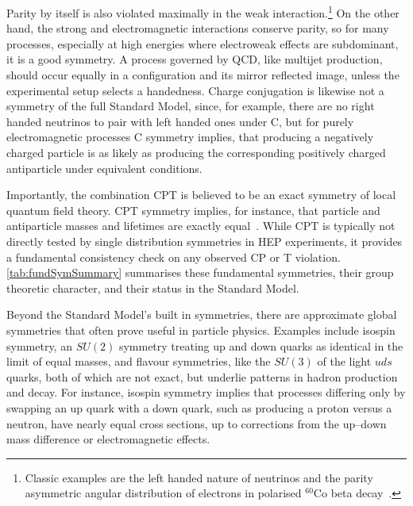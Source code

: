         Parity by itself is also violated maximally in the weak interaction.\footnote{Classic examples are the left handed nature of neutrinos and the parity asymmetric angular distribution of electrons in polarised $^{60}$Co beta decay~\cite{Wu:1957my}.}
        On the other hand, the strong and electromagnetic interactions conserve parity, so for many processes, especially at high energies where electroweak effects are subdominant, it is a good symmetry.
        A process governed by QCD, like multijet production, should occur equally in a configuration and its mirror reflected image, unless the experimental setup selects a handedness.
        Charge conjugation is likewise not a symmetry of the full Standard Model, since, for example, there are no right handed neutrinos to pair with left handed ones under C, but for purely electromagnetic processes C symmetry implies, that producing a negatively charged particle is as likely as producing the corresponding positively charged antiparticle under equivalent conditions.
        
        Importantly, the combination CPT is believed to be an exact symmetry of local quantum field theory.
        CPT symmetry implies, for instance, that particle and antiparticle masses and lifetimes are exactly equal~\cite{Kostelecky:1998ic}.
        While CPT is typically not directly tested by single distribution symmetries in HEP experiments, it provides a fundamental consistency check on any observed CP or T violation. \cref{tab:fundSymSummary} summarises these fundamental symmetries, their group theoretic character, and their status in the Standard Model.


        Beyond the Standard Model’s built in symmetries, there are approximate global symmetries that often prove useful in particle physics.
        Examples include isospin symmetry, an $SU(2)$ symmetry treating up and down quarks as identical in the limit of equal masses, and flavour symmetries, like the $SU(3)$ of the light $uds$ quarks, both of which are not exact, but underlie patterns in hadron production and decay.
        For instance, isospin symmetry implies that processes differing only by swapping an up quark with a down quark, such as producing a proton versus a neutron, have nearly equal cross sections, up to corrections from the up--down mass difference or electromagnetic effects.
        
